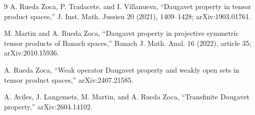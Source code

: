 \documentclass[11pt]{article}
\begin{document}
\begin{thebibliography}{9}
A. Rueda Zoca, P. Tradacete, and I. Villanueva,
``Daugavet property in tensor product spaces,''
J. Inst. Math. Jussieu 20 (2021), 1409--1428; arXiv:1903.01761.

M. Martin and A. Rueda Zoca,
``Daugavet property in projective symmetric tensor products of Banach
spaces,'' Banach J. Math. Anal. 16 (2022), article 35; arXiv:2010.15936.

A. Rueda Zoca,
``Weak operator Daugavet property and weakly open sets in tensor product
spaces,'' arXiv:2407.21585.

A. Aviles, J. Langemets, M. Martin, and A. Rueda Zoca,
``Transfinite Daugavet property,'' arXiv:2604.14102.
\end{thebibliography}
\end{document}
